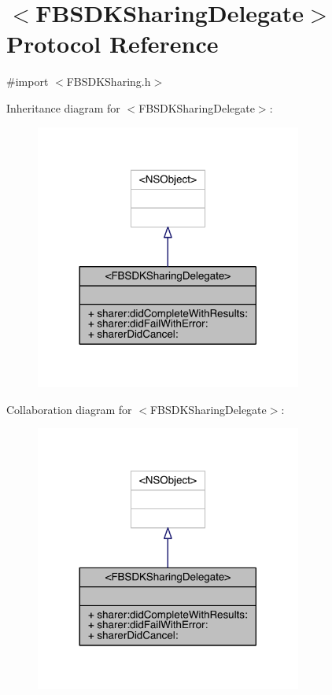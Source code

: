 \hypertarget{protocol_f_b_s_d_k_sharing_delegate-p}{\section{$<$F\-B\-S\-D\-K\-Sharing\-Delegate$>$ Protocol Reference}
\label{protocol_f_b_s_d_k_sharing_delegate-p}
}


{\ttfamily \#import $<$F\-B\-S\-D\-K\-Sharing.\-h$>$}



Inheritance diagram for $<$F\-B\-S\-D\-K\-Sharing\-Delegate$>$\-:
\nopagebreak
\begin{figure}[H]
\begin{center}
\leavevmode
\includegraphics[width=248pt]{protocol_f_b_s_d_k_sharing_delegate-p__inherit__graph}
\end{center}
\end{figure}


Collaboration diagram for $<$F\-B\-S\-D\-K\-Sharing\-Delegate$>$\-:
\nopagebreak
\begin{figure}[H]
\begin{center}
\leavevmode
\includegraphics[width=248pt]{protocol_f_b_s_d_k_sharing_delegate-p__coll__graph}
\end{center}
\end{figure}
